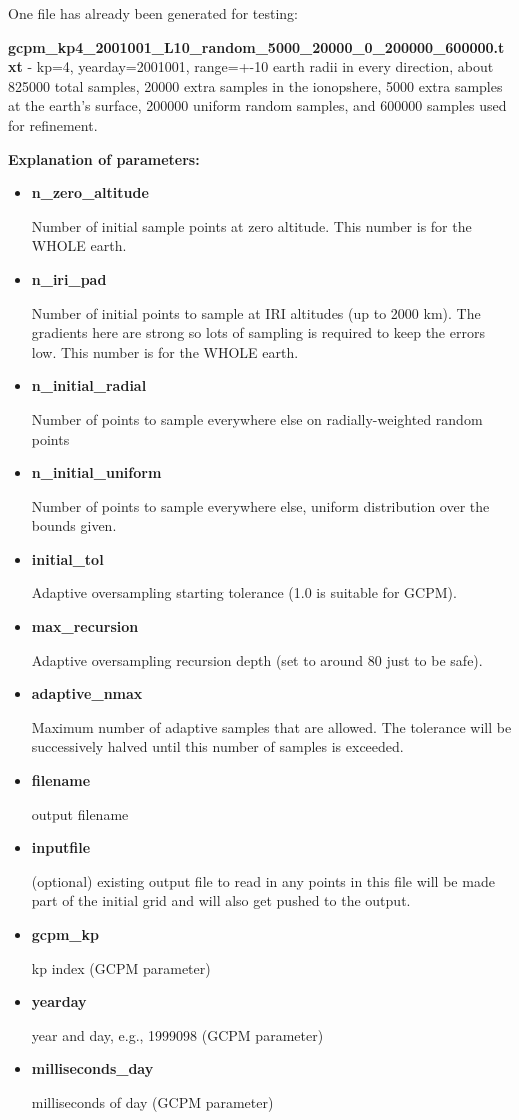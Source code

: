 \documentclass[10pt]{article}
\begin{document}
One file has already been generated for testing:

{\bf gcpm\_kp4\_2001001\_L10\_random\_5000\_20000\_0\_200000\_600000.txt} - kp=4,
yearday=2001001, range=+-10 earth radii in every direction,
about 825000 total samples, 20000 extra samples in the ionopshere,
5000 extra samples at the earth's surface, 200000 uniform random
samples, and 600000 samples used for refinement.

{\bf Explanation of parameters:}
\begin{itemize}
\item {\bf n\_zero\_altitude}

  Number of initial sample points at zero altitude.  This number is for the
  WHOLE earth.
\item {\bf  n\_iri\_pad      }

  Number of initial points to sample at IRI altitudes (up to 2000 km).
  The gradients here are strong so lots of sampling is required to
  keep the errors low.  This number is for the WHOLE earth.
\item {\bf n\_initial\_radial}

  Number of points to sample everywhere else on radially-weighted random points
\item {\bf n\_initial\_uniform}

 Number of points to sample everywhere else, uniform distribution over
 the bounds given.
\item {\bf initial\_tol     }

  Adaptive oversampling starting tolerance (1.0 is suitable for GCPM).
\item  {\bf max\_recursion   }

  Adaptive oversampling recursion depth (set to around 80 just to be safe).
\item {\bf adaptive\_nmax   }

  Maximum number of adaptive samples that are allowed.  The tolerance
  will be successively halved until this number of samples is
  exceeded.
\item {\bf filename        }

  output filename
\item {\bf inputfile       }

  (optional) existing output file to read in any points in this file
  will be made part of the initial grid and will also get pushed to
  the output.
\item {\bf gcpm\_kp         }

  kp index (GCPM parameter)
\item {\bf yearday         }

  year and day, e.g., 1999098 (GCPM parameter)
\item {\bf milliseconds\_day}

  milliseconds of day (GCPM parameter)
\end{itemize}
\end{document}
